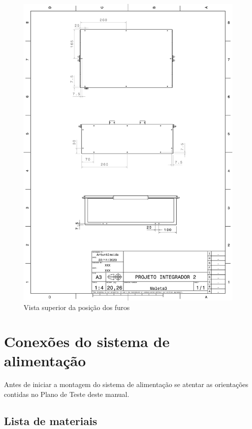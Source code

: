 \begin{figure}[H]
    \centering
    \includegraphics[width=\textwidth]{Figuras/montagemMaletasEstrutura/PARAFUSOALIMENTAÇÃO2.pdf}
    \caption{Vista superior da posição dos furos}
    \label{fig:posicaoFuroAlimentacao2}
\end{figure}

\section{Conexões do sistema de alimentação}

Antes de iniciar a montagem do sistema de alimentação se atentar as orientações contidas no Plano de Teste deste manual.

\subsection*{Lista de materiais}

